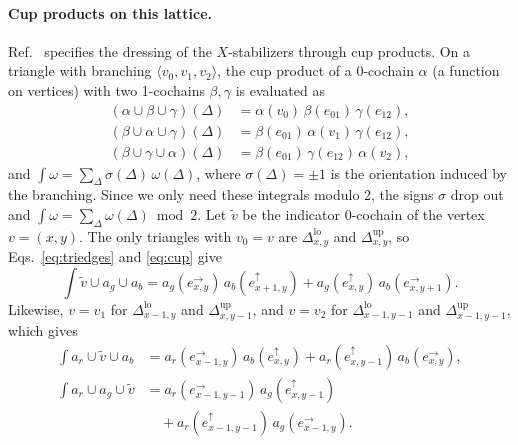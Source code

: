 \documentclass[a4paper]{article}
\newcommand{\rd}{r}
\newcommand{\gr}{g}
\newcommand{\bl}{b}
\newcommand{\eh}[1]{e^{\rightarrow}_{#1}}   %
\newcommand{\ev}[1]{e^{\uparrow}_{#1}}      %
\newcommand{\tlo}[1]{\Delta^{\mathrm{lo}}_{#1}}
\newcommand{\tup}[1]{\Delta^{\mathrm{up}}_{#1}}
\begin{document}
\paragraph{Cup products on this lattice.}
Ref.~\cite{kobayashi2025clifford} specifies the dressing of the $X$-stabilizers through cup products. On a triangle with branching $\langle v_0,v_1,v_2\rangle$, the cup product of a 0-cochain $\alpha$ (a function on vertices) with two 1-cochains $\beta,\gamma$ is evaluated as~\cite{kobayashi2025clifford}
\begin{align}
  (\alpha\cup\beta\cup\gamma)(\Delta)&=\alpha(v_0)\,\beta(e_{01})\,\gamma(e_{12}),\nonumber\\
  (\beta\cup\alpha\cup\gamma)(\Delta)&=\beta(e_{01})\,\alpha(v_1)\,\gamma(e_{12}),\label{eq:cup}\\
  (\beta\cup\gamma\cup\alpha)(\Delta)&=\beta(e_{01})\,\gamma(e_{12})\,\alpha(v_2),\nonumber
\end{align}
and $\int\omega=\sum_\Delta\sigma(\Delta)\,\omega(\Delta)$, where $\sigma(\Delta)=\pm1$ is the orientation induced by the branching. Since we only need these integrals modulo 2, the signs $\sigma$ drop out and $\int\omega=\sum_\Delta\omega(\Delta)\bmod 2$. Let $\tilde v$ be the indicator 0-cochain of the vertex $v=(x,y)$. The only triangles with $v_0=v$ are $\tlo{x,y}$ and $\tup{x,y}$, so Eqs.~\eqref{eq:triedges} and \eqref{eq:cup} give
\begin{equation}
  \int\tilde v\cup a_\gr\cup a_\bl
  =a_\gr(\eh{x,y})\,a_\bl(\ev{x+1,y})+a_\gr(\ev{x,y})\,a_\bl(\eh{x,y+1}).
  \label{eq:cupR}
\end{equation}
Likewise, $v=v_1$ for $\tlo{x-1,y}$ and $\tup{x,y-1}$, and $v=v_2$ for $\tlo{x-1,y-1}$ and $\tup{x-1,y-1}$, which gives
\begin{align}
  \int a_\rd\cup\tilde v\cup a_\bl
  &=a_\rd(\eh{x-1,y})\,a_\bl(\ev{x,y})+a_\rd(\ev{x,y-1})\,a_\bl(\eh{x,y}),\nonumber\\
  \int a_\rd\cup a_\gr\cup\tilde v
  &=a_\rd(\eh{x-1,y-1})\,a_\gr(\ev{x,y-1})\nonumber\\
  &\quad+a_\rd(\ev{x-1,y-1})\,a_\gr(\eh{x-1,y}).
  \label{eq:cupGB}
\end{align}
\end{document}
